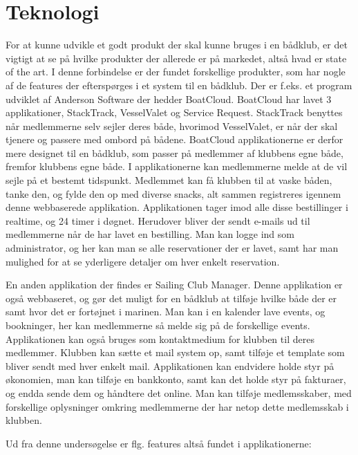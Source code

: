 \chapter{Teknologi}\label{teknologi-analyse}

For at kunne udvikle et godt produkt der skal kunne bruges i en bådklub, er det vigtigt at se på hvilke produkter der
allerede er på markedet, altså hvad er state of the art. I denne forbindelse er der fundet forskellige produkter, som
har nogle af de features der efterspørges i et system til en bådklub. Der er f.eks. et program udviklet af Anderson
Software der hedder BoatCloud.\citep{BoatCloud} BoatCloud har lavet 3 applikationer, StackTrack, VesselValet og Service
Request. StackTrack benyttes når medlemmerne selv sejler deres både, hvorimod VesselValet, er når der skal tjenere og
passere med ombord på bådene. BoatCloud applikationerne er derfor mere designet til en bådklub, som passer på medlemmer
af klubbens egne både, fremfor klubbens egne både. I applikationerne kan medlemmerne melde at de vil sejle på et bestemt
tidspunkt. Medlemmet kan få klubben til at vaske båden, tanke den, og fylde den op med diverse snacks, alt sammen
registreres igennem denne webbaserede applikation. Applikationen tager imod alle disse bestillinger i realtime, og 24
timer i døgnet. Herudover bliver der sendt e-mails ud til medlemmerne når de har lavet en bestilling. Man kan logge ind
som administrator, og her kan man se alle reservationer der er lavet, samt har man mulighed for at se yderligere
detaljer om hver enkelt reservation.

En anden applikation der findes er Sailing Club Manager. \citep{SailClub} Denne applikation er også webbaseret, og gør
det muligt for en bådklub at tilføje hvilke både der er samt hvor det er fortøjnet i marinen. Man kan i en kalender
lave events, og bookninger, her kan medlemmerne så melde sig på de forskellige events. Applikationen kan også bruges som
kontaktmedium for klubben til deres medlemmer. Klubben kan sætte et mail system op, samt tilføje et template som bliver
sendt med hver enkelt mail. Applikationen kan endvidere holde styr på økonomien, man kan tilføje en bankkonto, samt kan
det holde styr på fakturaer, og endda sende dem og håndtere det online. Man kan tilføje medlemsskaber, med forskellige
oplysninger omkring medlemmerne der har netop dette medlemsskab i klubben.

Ud fra denne undersøgelse er flg. features altså fundet i applikationerne:

